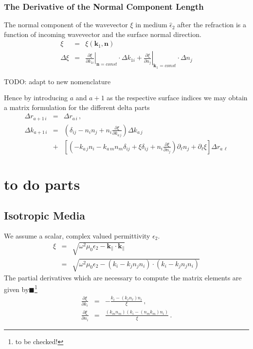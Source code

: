 \documentclass[12pt,a4paper,twoside,openright,BCOR10mm,headsepline,titlepage,abstracton,chapterprefix,final]{scrreprt}
\newcommand\Vector[1]{{\mathbf{#1}}}
\newcommand\vacuum{0}
\newcommand\wavenumber{k}
\newcommand\Wavevector{\Vector{\wavenumber}}
\newcommand\Tensor[1]{\hat{#1}}
\newcommand\vacuumpermeability{\mu_{\vacuum}}
\newcommand\permittivity{\Tensor{\epsilon}}
\newcommand\scalarpermittivity{\epsilon}
\newcommand{\remark}[1]{{\color{red}$\blacksquare$}\footnote{{\color{red}#1}}}
\begin{document}
\subsubsection{The Derivative of the Normal Component Length}
The normal component of the wavevector $\xi$ in medium $\permittivity_2$ after the refraction 
is a function of incoming wavevector and the surface normal direction.
\begin{eqnarray}
 \xi &=& \xi(\Wavevector_{1}, \Vector{n}) \\
 \Delta \xi &=& 
     \left.  \frac{\partial \xi}{\partial k_{1i}}  \right|_{\Vector{n}=const} \cdot \Delta k_{1i}
   + \left. \frac{\partial \xi}{\partial n_j} \right|_{\Wavevector_{1}=const} \cdot \Delta n_j
\end{eqnarray}

TODO: adapt to new nomenclature

Hence by introducing $a$ and $a+1$ as the respective surface indices we may obtain a matrix formulation for the different delta parts
\begin{eqnarray}
 \Delta r_{a+1\,i} &=& \Delta r_{a\,i}\,,\\
 \Delta \wavenumber_{a+1\,i} &=& 
   \left( \delta_{ij}  - n_i n_j + n_i \frac{\partial \xi}{\partial \wavenumber_{a\,j}}\right) \Delta\wavenumber_{a\,j} \nonumber\\
   &+&
   \left[
      \left(
     - \wavenumber_{a\,j}  n_i 
     - \wavenumber_{a\,m} n_m \delta_{ij}  
     + \xi \delta_{ij}
     + n_i \frac{\partial \xi}{\partial n_j}
    \right) \partial_\ell n_j + \partial_\ell \xi\right]\Delta r_{a\,\ell}
\end{eqnarray}



\section{to do parts}

\subsection{Isotropic Media}
We assume a scalar, complex valued permittivity $\scalarpermittivity_2$.
\begin{eqnarray}
 \xi &=& \sqrt{\omega^2 \vacuumpermeability \scalarpermittivity_2 - \Wavevector_{\parallel} \cdot \Wavevector_{\parallel}} \nonumber\\
      &=& \sqrt{\omega^2 \vacuumpermeability \scalarpermittivity_2 - (\wavenumber_i - \wavenumber_j n_j n_i) \cdot (\wavenumber_i - \wavenumber_j n_j n_i)}
\end{eqnarray}
The partial derivatives which are necessary to compute the matrix elements are given by\remark{to be checked!}
\begin{eqnarray}
 \frac{\partial \xi}{\partial k_i} &=& -\frac{k_i - (k_\ell n_\ell) n_i}{\xi}\,,\\
 \frac{\partial \xi}{\partial n_i} &=& \frac{(k_m n_m) (k_i - (n_m k_m) n_i)}{\xi}\,.
\end{eqnarray}
\end{document}
